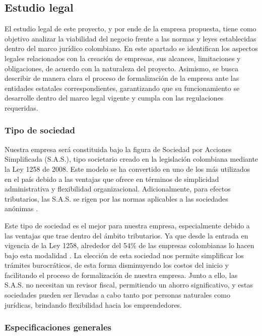 \subsection*{Estudio legal}

El estudio legal de este proyecto, y por ende de la empresa propuesta, tiene como objetivo analizar la viabilidad del negocio frente a las normas y leyes establecidas dentro del marco jurídico colombiano. En este apartado se identifican los aspectos legales relacionados con la creación de empresas, sus alcances, limitaciones y obligaciones, de acuerdo con la naturaleza del proyecto. Asimismo, se busca describir de manera clara el proceso de formalización de la empresa ante las entidades estatales correspondientes, garantizando que su funcionamiento se desarrolle dentro del marco legal vigente y cumpla con las regulaciones requeridas.

\subsubsection*{Tipo de sociedad}

Nuestra empresa será constituida bajo la figura de Sociedad por Acciones Simplificada (S.A.S.), tipo societario creado en la legislación colombiana mediante la Ley 1258 de 2008. Este modelo se ha convertido en uno de los más utilizados en el país debido a las ventajas que ofrece en términos de simplicidad administrativa y flexibilidad organizacional. Adicionalmente, para efectos tributarios, las S.A.S. se rigen por las normas aplicables a las sociedades anónimas \parencite{Ley1258}.

Este tipo de sociedad es el mejor para nuestra empresa, especialmente debido a las ventajas que trae dentro del ámbito tributarios. Ya que desde la entrada en vigencia de la Ley 1258, alrededor del 54\% de las empresas colombianas lo hacen bajo esta modalidad \parencite{Actualicese01}. La elección de esta sociedad nos permite simplificar los trámites burocráticos, de esta forma disminuyendo los costos del inicio y facilitando el proceso de formalización de nuestra empresa. Junto a ello, las S.A.S. no necesitan un revisor fiscal, permitiendo un ahorro significativo, y estas sociedades pueden ser llevadas a cabo tanto por personas naturales como jurídicas, brindando flexibilidad hacia los emprendedores.

\subsubsection*{Especificaciones generales}

